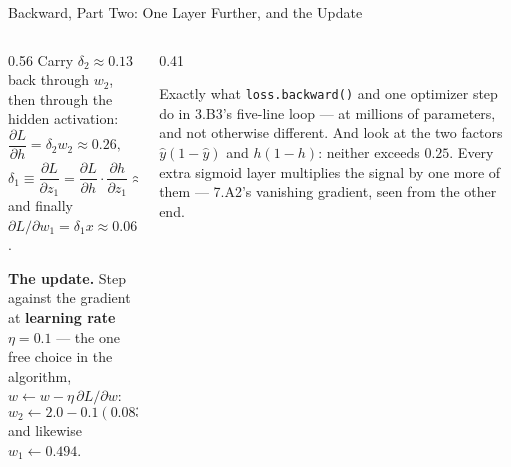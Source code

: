 \begin{frame}{Backward, Part Two: One Layer Further, and the Update}
\begin{columns}[T]
\begin{column}{0.56\textwidth}
\small
Carry $\delta_2\approx0.13$ back through $w_2$, then through the hidden activation:
\[
  \frac{\partial L}{\partial h}=\delta_2 w_2\approx0.26,\qquad
  \frac{\partial h}{\partial z_1}=h(1-h)\approx0.24 ,
\]
\[
  \delta_1\equiv\frac{\partial L}{\partial z_1}=\frac{\partial L}{\partial h}\cdot\frac{\partial h}{\partial z_1}\approx0.06 ,
\]
and finally $\partial L/\partial w_1=\delta_1 x\approx0.06$.
\medskip

\textbf{The update.} Step against the gradient at \textbf{learning rate} $\eta=0.1$ --- the one free choice in the algorithm, $w\leftarrow w-\eta\,\partial L/\partial w$:
\[
  w_2\leftarrow2.0-0.1(0.0839)=1.992 ,
\]
and likewise $w_1\leftarrow0.494$.
\end{column}
\begin{column}{0.41\textwidth}
\begin{takeawaybox}[title=\textbf{That is the whole algorithm}]\small
Exactly what \texttt{loss.backward()} and one optimizer step do in 3.B3's five-line loop --- at millions of parameters, and not otherwise different.
\medskip
And look at the two factors $\hat y(1-\hat y)$ and $h(1-h)$: neither exceeds $\mathbf{0.25}$. Every extra sigmoid layer multiplies the signal by one more of them --- 7.A2's vanishing gradient, seen from the other end.
\end{takeawaybox}
\end{column}
\end{columns}
\vspace{1mm}
\end{frame}

